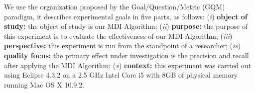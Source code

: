 We use the organization proposed by the Goal/Question/Metric (GQM) paradigm, it describes experimental goals in five parts, as follows:
%
%
%
%
%
%
%
(\textit{i}) \textbf{object of study:} the object of study is our MDI Algorithm; (\textit{ii}) \textbf{purpose:} the purpose of this experiment is to evaluate the effectiveness of our MDI Algorithm; (\textit{iii}) \textbf{perspective:} this experiment is run from the standpoint of a researcher; (\textit{iv}) \textbf{quality focus:} the primary effect under investigation is the precision and recall after applying the MDI Algorithm; (\textit{v}) \textbf{context:} this experiment was carried out using Eclipse 4.3.2 on a 2.5 GHz Intel Core i5 with 8GB of physical memory running Mac OS X 10.9.2.








